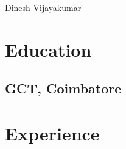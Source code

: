 \documentclass[10pt]{article}
\begin{document}
Dinesh Vijayakumar


\begin{minipage}[t]{0.33\textwidth}

\section*{Education}

\subsection*{GCT, Coimbatore}


\end{minipage}
\hfill
\begin{minipage}[t]{0.66\textwidth}
\section*{Experience}
\end{minipage}
\end{document}
